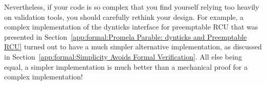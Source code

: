 Nevertheless, if your code is so complex that you find yourself
relying too heavily on validation
tools, you should carefully rethink your design.
For example, a complex implementation of the dynticks interface for
preemptable RCU that was presented in
Section~\ref{app:formal:Promela Parable: dynticks and Preemptable RCU}
turned out to
have a much simpler alternative implementation, as discussed in
Section~\ref{app:formal:Simplicity Avoids Formal Verification}.
All else being equal, a simpler implementation is much better than
a mechanical proof for a complex implementation!
